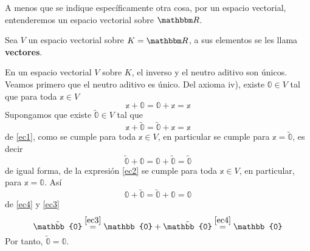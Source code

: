 \begin{convention}
A menos que se indique específicamente otra cosa, por un espacio vectorial, entenderemos un espacio vectorial sobre $\RR$.
\end{convention}

\begin{definition}
    Sea $V$ un espacio vectorial sobre $K = \RR$, a sus elementos se les llama \textbf{vectores}.
\end{definition}

\begin{theorem}
    En un espacio  vectorial $V$ sobre $K$, el inverso y el neutro aditivo son únicos. \\
    \demostracion
    Veamos primero que el neutro aditivo es único. Del axioma iv), existe $\mathbb{0} \in V$ tal que para toda $\mathbb{x} \in V$
    \begin{equation}
        \mathbb{x} + \mathbb{0} = \mathbb{0} + \mathbb{x} = \mathbb{x} \label{ec1}
    \end{equation}
    Supongamos que existe $\tilde{\mathbb{0}} \in V$ tal que
    \begin{equation}
        \mathbb{x} + \tilde{\mathbb{0}} = \tilde{\mathbb{0}} + \mathbb{x} = \mathbb{x} \label{ec2}
    \end{equation}
    de \eqref{ec1}, como se cumple para toda $\mathbb{x} \in V$, en particular se cumple para $\mathbb{x} = \tilde{\mathbb{0}}$, es decir
    \begin{equation}
        \tilde{\mathbb{0}} + \mathbb{0} = \mathbb{0} + \tilde{\mathbb{0}} = \tilde{\mathbb{0}} \label{ec3}
    \end{equation}
    de igual forma, de la expresión \eqref{ec2} se cumple para toda $\mathbb{x} \in V$, en particular, para $\mathbb{x} = \mathbb{0}$. Así
    \begin{equation}
        \mathbb{0} + \tilde{\mathbb{0}} = \tilde{\mathbb{0}} + \mathbb{0} = \mathbb{0} \label{ec4}
    \end{equation}
    de \eqref{ec4} y \eqref{ec3}
    \begin{equation*}
        \tilde{\mathbb{0}} \stackrel{\eqref{ec3}}{=} \mathbb{0} + \tilde{\mathbb{0}} \stackrel{\eqref{ec4}}{=} \mathbb{0}
    \end{equation*}
    Por tanto, $\tilde{\mathbb{0}} = \mathbb{0}$.


\end{theorem}
